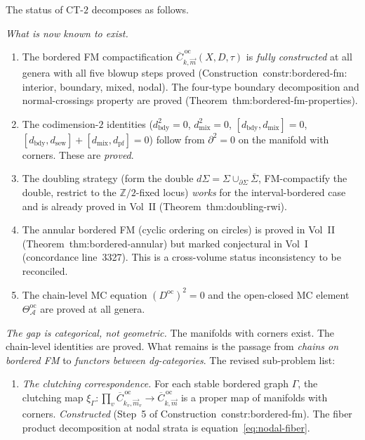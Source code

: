 \documentclass[11pt]{article}
\newcommand{\cA}{\mathcal{A}}
\newcommand{\Z}{\mathbb{Z}}
\begin{document}
\begin{remark}
\label{rem:ct2-revised-status}
The status of CT-$2$ decomposes as follows.

\smallskip\noindent
\emph{What is now known to exist.}
\begin{enumerate}[label=\textup{(\alph*)},nosep]
\item The bordered FM compactification
  $\overline{C}^{\,\mathrm{oc}}_{k,\vec{m}}(X, D, \tau)$ is
  \emph{fully constructed} at all genera with all five blowup
  steps proved (Construction~\textup{constr:bordered-fm}:
  interior, boundary, mixed, nodal).  The
  four-type boundary decomposition and normal-crossings
  property are proved
  (Theorem~\textup{thm:bordered-fm-properties}).
\item The codimension-$2$ identities
  ($d_{\mathrm{bdy}}^2 = 0$, $d_{\mathrm{mix}}^2 = 0$,
  $[d_{\mathrm{bdy}}, d_{\mathrm{mix}}] = 0$,
  $[d_{\mathrm{bdy}}, d_{\mathrm{sew}}] +
  [d_{\mathrm{mix}}, d_{\mathrm{pf}}] = 0$)
  follow from $\partial^2 = 0$ on the manifold with corners.
  These are \emph{proved}.
\item The doubling strategy (form the double
  $d\Sigma = \Sigma \cup_{\partial\Sigma} \bar\Sigma$,
  FM-compactify the double, restrict to the $\Z/2$-fixed locus)
  \emph{works} for the interval-bordered case and is already
  proved in Vol~II (Theorem~\textup{thm:doubling-rwi}).
\item The annular bordered FM (cyclic ordering on circles)
  is proved in Vol~II
  (Theorem~\textup{thm:bordered-annular}) but marked
  conjectural in Vol~I (concordance line~3327).  This is a
  cross-volume status inconsistency to be reconciled.
\item The chain-level MC equation $(D^{\mathrm{oc}})^2 = 0$
  and the open-closed MC element $\Theta^{\mathrm{oc}}_\cA$
  are proved at all genera.
\end{enumerate}

\smallskip\noindent
\emph{The gap is categorical, not geometric.}
The manifolds with corners exist.  The chain-level identities
are proved.  What remains is the passage from \emph{chains on
bordered FM} to \emph{functors between dg-categories}.  The
revised sub-problem list:

\begin{enumerate}[label=\textup{(P\arabic*$'$)},nosep]
\item \emph{The clutching correspondence.}
  For each stable bordered graph $\Gamma$, the clutching map
  $\xi_\Gamma \colon
  \prod_{v} \overline{C}^{\,\mathrm{oc}}_{k_v, \vec{m}_v}
  \to \overline{C}^{\,\mathrm{oc}}_{k, \vec{m}}$
  is a proper map of manifolds with corners.
  \emph{Constructed} (Step~5 of
  Construction~\textup{constr:bordered-fm}).  The fiber
  product decomposition at nodal strata is
  equation~\eqref{eq:nodal-fiber}.


\end{enumerate}
\end{remark}
\end{document}
